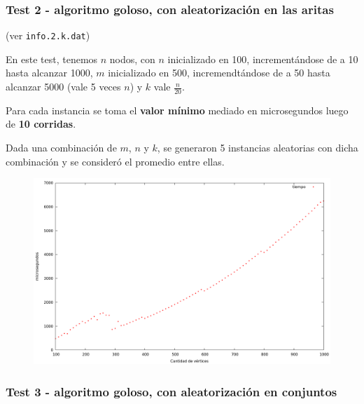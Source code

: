 \vspace*{0.5cm}


\newpage
\subsubsection{Test 2 - algoritmo goloso, con aleatorización en las aritas}

(ver \verb|info.2.k.dat|) \medskip

En este test, tenemos $n$ nodos, con $n$ inicializado en 100, incrementándose de a 10 hasta alcanzar 1000, $m$ inicializado en 500, incremendtándose de a 50 hasta alcanzar 5000 (vale 5 veces $n$) y $k$ vale $\frac{n}{20}$.

Para cada instancia se toma el \textbf{valor mínimo} mediado en microsegundos luego de \textbf{10 corridas}.

Dada una combinación de $m$, $n$ y $k$, se generaron 5 instancias aleatorias con dicha combinación y se consideró el promedio entre ellas.

\vspace*{0.5cm}

\begin{figure}[h]
  \begin{center}
    \includegraphics[scale=0.35]{imagenes/grafico-greedy-a.png}
  \end{center}
\end{figure}

\vspace{0.5cm}


\newpage
\subsubsection{Test 3 - algoritmo goloso, con aleatorización en conjuntos}

